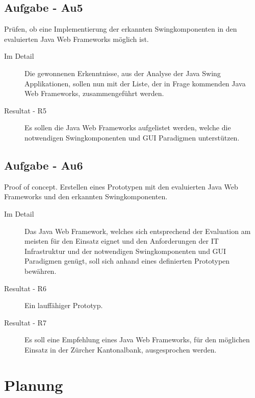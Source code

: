   \subsection{Aufgabe - Au5\label{itm:Aufgabe-05}}

  \begin{itshape}Prüfen, ob eine Implementierung der erkannten
    Swingkomponenten in den evaluierten Java Web Frameworks möglich
    ist.\end{itshape}
    
  \begin{description}
    \item[Im Detail\label{itm:Detail-05}]
    Die gewonnenen Erkenntnisse, aus der Analyse der Java Swing Applikationen,
    sollen nun mit der Liste, der in Frage kommenden Java Web Frameworks,
    zusammengeführt werden.
    \item[Resultat - R5\label{itm:Resultat-05}]
    Es sollen die Java Web Frameworks aufgelistet werden, welche die
    notwendigen Swingkomponenten und GUI Paradigmen unterstützen.
  \end{description}

  \subsection{Aufgabe - Au6\label{itm:Aufgabe-06}}

  \begin{itshape}Proof of concept. Erstellen eines Prototypen mit den
    evaluierten Java Web Frameworks und den erkannten
    Swingkomponenten.\end{itshape}
  
  \begin{description}
    \item[Im Detail\label{itm:Detail-06}]
    Das Java Web Framework, welches sich entsprechend der Evaluation am meisten
    für den Einsatz eignet und den Anforderungen der IT Infrastruktur und der
    notwendigen Swingkomponenten und GUI Paradigmen genügt, soll sich anhand
    eines definierten Prototypen bewähren.
    \item[Resultat - R6\label{itm:Resultat-06}]
    Ein lauffähiger Prototyp.
    \item[Resultat - R7\label{itm:Resultat-07}]
    Es soll eine Empfehlung eines Java Web Frameworks, für den möglichen Einsatz
    in der Zürcher Kantonalbank, ausgesprochen werden.
  \end{description}
  
  \section{Planung}
  
